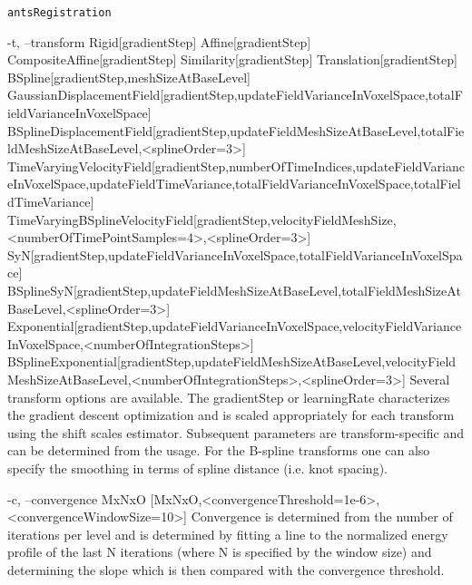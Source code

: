 \documentclass[ignorenonframetext,]{beamer}
\newenvironment{Shaded}{\begin{snugshade}}{\end{snugshade}}
\newcommand{\StringTok}[1]{\textcolor[rgb]{0.31,0.60,0.02}{{#1}}}
\begin{document}
\begin{frame}[fragile]{\texttt{antsRegistration}}
\begin{Shaded}
\begin{Highlighting}[]
\StringTok{     -t, --transform Rigid[gradientStep]}
\StringTok{                     Affine[gradientStep]}
\StringTok{                     CompositeAffine[gradientStep]}
\StringTok{                     Similarity[gradientStep]}
\StringTok{                     Translation[gradientStep]}
\StringTok{                     BSpline[gradientStep,meshSizeAtBaseLevel]}
\StringTok{                     GaussianDisplacementField[gradientStep,updateFieldVarianceInVoxelSpace,totalFieldVarianceInVoxelSpace]}
\StringTok{                     BSplineDisplacementField[gradientStep,updateFieldMeshSizeAtBaseLevel,totalFieldMeshSizeAtBaseLevel,<splineOrder=3>]}
\StringTok{                     TimeVaryingVelocityField[gradientStep,numberOfTimeIndices,updateFieldVarianceInVoxelSpace,updateFieldTimeVariance,totalFieldVarianceInVoxelSpace,totalFieldTimeVariance]}
\StringTok{                     TimeVaryingBSplineVelocityField[gradientStep,velocityFieldMeshSize,<numberOfTimePointSamples=4>,<splineOrder=3>]}
\StringTok{                     SyN[gradientStep,updateFieldVarianceInVoxelSpace,totalFieldVarianceInVoxelSpace]}
\StringTok{                     BSplineSyN[gradientStep,updateFieldMeshSizeAtBaseLevel,totalFieldMeshSizeAtBaseLevel,<splineOrder=3>]}
\StringTok{                     Exponential[gradientStep,updateFieldVarianceInVoxelSpace,velocityFieldVarianceInVoxelSpace,<numberOfIntegrationSteps>]}
\StringTok{                     BSplineExponential[gradientStep,updateFieldMeshSizeAtBaseLevel,velocityFieldMeshSizeAtBaseLevel,<numberOfIntegrationSteps>,<splineOrder=3>]}
\StringTok{          Several transform options are available. The gradientStep or learningRate}
\StringTok{          characterizes the gradient descent optimization and is scaled appropriately for}
\StringTok{          each transform using the shift scales estimator. Subsequent parameters are}
\StringTok{          transform-specific and can be determined from the usage. For the B-spline}
\StringTok{          transforms one can also specify the smoothing in terms of spline distance (i.e.}
\StringTok{          knot spacing).}

\StringTok{     -c, --convergence MxNxO}
\StringTok{                       [MxNxO,<convergenceThreshold=1e-6>,<convergenceWindowSize=10>]}
\StringTok{          Convergence is determined from the number of iterations per level and is}
\StringTok{          determined by fitting a line to the normalized energy profile of the last N}
\StringTok{          iterations (where N is specified by the window size) and determining the slope}
\StringTok{          which is then compared with the convergence threshold.}


\end{Highlighting}
\end{Shaded}
\end{frame}
\end{document}
